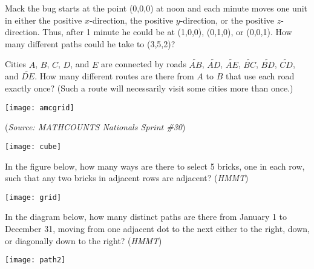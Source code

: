 		\clearpage
		
	    \begin{problem}
	    Mack the bug starts at the point (0,0,0) at noon and each minute moves one unit in either the positive $x$-direction, the positive $y$-direction, or the positive $z$-direction. Thus, after 1 minute he could be at (1,0,0), (0,1,0), or (0,0,1). How many different paths could he take to (3,5,2)?
	    \end{problem}

		\begin{problem}
		Cities $A$, $B$, $C$, $D$, and $E$ are connected by roads $\widetilde{AB}$, $\widetilde{AD}$, $\widetilde{AE}$, $\widetilde{BC}$, $\widetilde{BD}$, $\widetilde{CD}$, and $\widetilde{DE}$. How many different routes are there from $A$ to $B$ that use each road exactly once? (Such a route will necessarily visit some cities more than once.)
		\begin{center}
        \texttt{[image: amcgrid]}
        \end{center}
		\end{problem}
		
		\begin{problem}
		(\textit{Source: MATHCOUNTS Nationals Sprint \#30})
		\begin{center}
        \texttt{[image: cube]}
        \end{center}
		\end{problem}
		
		\begin{problem}
        In the figure below, how many ways are there to select 5 bricks, one in each row, such that any two bricks in adjacent rows are adjacent? (\textit{HMMT})
        \begin{center}
        \texttt{[image: grid]}
        \end{center}
        \end{problem}
        
        \clearpage
        
        \begin{problem}
        In the diagram below, how many distinct paths are there from January 1 to December 31, moving from one adjacent dot to the next either to the right, down, or diagonally down to the right? (\textit{HMMT})
        \begin{center}
        \texttt{[image: path2]}
        \end{center}
        \end{problem}
		
